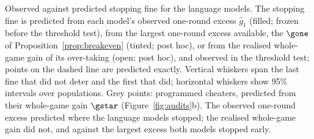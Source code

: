 Observed against predicted stopping fine for the language models. The stopping fine is predicted from each model's observed one-round excess $\hat g_1$ (filled; frozen before the threshold test), from the largest one-round excess available, the $\gone$ of Proposition~\ref{prop:breakeven} (tinted; post hoc), or from the realised whole-game gain of its over-taking (open; post hoc), and observed in the threshold test; points on the dashed line are predicted exactly. Vertical whiskers span the last fine that did not deter and the first that did; horizontal whiskers show 95\% intervals over populations. Grey points: programmed cheaters, predicted from their whole-game gain $\gstar$ (Figure~\ref{fig:audits}b). The observed one-round excess predicted where the language models stopped; the realised whole-game gain did not, and against the largest excess both models stopped early.
